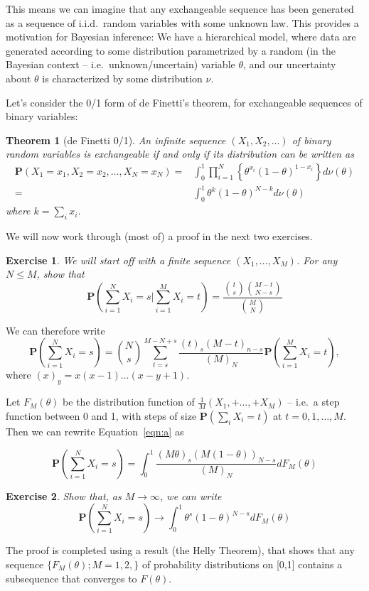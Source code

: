 \documentclass[twoside]{article}
\newcounter{lecnum}
\newtheorem{theorem}{Theorem}[lecnum]
\newtheorem{exercise}{Exercise}[lecnum]
\newcommand\Prob{\mathbf{P}}
\begin{document}
This means we can imagine that any exchangeable sequence has been generated as a sequence of i.i.d.\ random variables with some unknown law. This provides a motivation for Bayesian inference: We have a hierarchical model, where data are generated according to some distribution parametrized by a random (in the Bayesian context -- i.e.\ unknown/uncertain) variable $\theta$, and our uncertainty about $\theta$ is characterized by some distribution $\nu$.

Let's consider the 0/1 form of de Finetti's theorem, for exchangeable sequences of binary variables:


\begin{theorem}[de Finetti 0/1]
  An infinite sequence $(X_1,X_2,\dots)$ of binary random variables is exchangeable if and only if its distribution can be written as
  $$\begin{aligned}\Prob(X_1=x_1,X_2=x_2,\dots, X_N=x_N)  =& \int_0^1\prod_{i=1}^N\left\{\theta^{x_i}(1-\theta)^{1-x_i}\right\} d\nu(\theta)\\
    =&\int_0^1 \theta^{k}(1-\theta)^{N-k} d\nu(\theta)\end{aligned}$$
  where $k=\sum_ix_i$.
\end{theorem}

We will now work through (most of) a proof in the next two exercises.

\begin{exercise}
  We will start off with a finite sequence $(X_1,\dots, X_M)$. For any $N\leq M$, show that
  $$\Prob\left(\sum_{i=1}^N X_i = s\Big|\sum_{i=1}^M X_i = t\right) = \frac{{t\choose s}{M-t\choose N-s}}{{M \choose N}}$$
\end{exercise}
We can therefore write
\begin{equation}\Prob\left(\sum_{i=1}^N X_i = s\right) = {N\choose s}\sum_{t=s}^{M-N+s}\frac{(t)_s(M-t)_{n-s}}{(M)_N}\Prob\left(\sum_{i=1}^M X_i = t\right),\label{eqn:a}\end{equation}
where $(x)_y = x(x-1)\dots (x-y+1)$.

Let $F_M(\theta)$ be the distribution function of $\frac{1}{M}(X_1, + \dots, + X_M)$  --  i.e.\ a step function between 0 and 1, with steps of size $\Prob(\sum_i X_i= t)$ at $t=0,1,\dots, M$. Then we can rewrite Equation~\ref{eqn:a} as

$$\Prob\left(\sum_{i=1}^N X_i = s\right) = \int_0^1\frac{(M\theta)_s(M(1-\theta))_{N-s}}{(M)_N}dF_M(\theta)$$
\begin{exercise}
  Show that, as $M\rightarrow \infty$, we can write
  $$\Prob\left(\sum_{i=1}^N X_i = s\right) \rightarrow \int_0^1\theta^s(1-\theta)^{N-s}dF_M(\theta)$$
\end{exercise}
The proof is completed using a result (the Helly Theorem), that shows that any sequence $\{F_M(\theta); M=1,2,\dot\}$ of probability distributions on [0,1] contains a subsequence that converges to $F(\theta)$.
\end{document}
